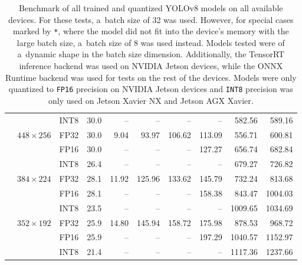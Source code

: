 \begin{appendices}
\begin{table}
\begin{threeparttable}
\begin{tabular}{|c|c|c|c|rrrrrr|}
                                                                    &                                   & INT8 & 30.0 &    -- &     -- &     -- &     -- &  582.56 &  589.16 \\
            \cline{2-10}
                                                                    & \multirow{3}{*}{$448 \times 256$} & FP32 & 30.0 &  9.04 &  93.97 & 106.62 & 113.09 &  556.71 &  600.81 \\
                                                                    &                                   & FP16 & 30.0 &    -- &     -- &     -- & 127.27 &  656.74 &  682.84 \\
                                                                    &                                   & INT8 & 26.4 &    -- &     -- &     -- &     -- &  679.27 &  726.82 \\
            \cline{2-10}
                                                                    & \multirow{3}{*}{$384 \times 224$} & FP32 & 28.1 & 11.92 & 125.96 & 133.62 & 145.79 &  732.24 &  813.68 \\
                                                                    &                                   & FP16 & 28.1 &    -- &     -- &     -- & 158.38 &  843.47 & 1004.03 \\
                                                                    &                                   & INT8 & 23.5 &    -- &     -- &     -- &     -- & 1009.65 & 1034.69 \\
            \cline{2-10}
                                                                    & \multirow{3}{*}{$352 \times 192$} & FP32 & 25.9 & 14.80 & 145.94 & 158.72 & 175.98 &  878.53 &  968.72 \\
                                                                    &                                   & FP16 & 25.9 &    -- &     -- &     -- & 197.29 & 1040.57 & 1152.97 \\
                                                                    &                                   & INT8 & 21.4 &    -- &     -- &     -- &     -- & 1117.36 & 1237.66 \\
            \hline
            \end{tabular}
        \caption{Benchmark of all trained and quantized YOLOv8 models on all
        available devices. For these tests, a~batch size of 32 was used. However,
        for special cases marked by \texttt{*}, where the model did not fit into the
        device's memory with the large batch size, a~batch size of 8 was used
        instead. Models tested were of a~dynamic shape in the batch size dimension.
        Additionally, the TensorRT inference backend was used on NVIDIA Jetson
        devices, while the ONNX Runtime backend was used for tests on the rest of
        the devices. Models were only quantized to \texttt{FP16} precision on NVIDIA
        Jetson devices and \texttt{INT8} precision was only used on Jetson Xavier NX
        and Jetson AGX Xavier.}
        \label{mAPvsFPS32}
    \end{threeparttable}
    \normalsize
\end{table}



\end{appendices}
